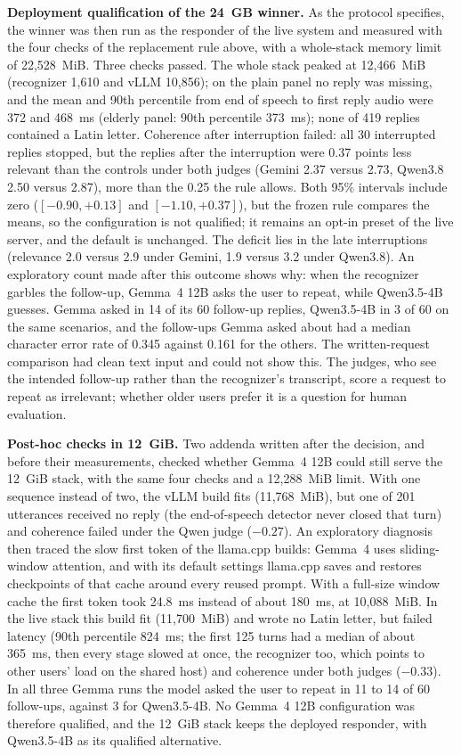 \textbf{Deployment qualification of the 24~GB winner.} As the protocol specifies, the winner
was then run as the responder of the live system and measured with the four checks of the
replacement rule above, with a whole-stack memory limit of 22,528~MiB. Three checks passed.
The whole stack peaked at 12,466~MiB (recognizer 1,610 and vLLM 10,856); on the plain panel
no reply was missing, and the mean and 90th percentile from end of speech to first reply
audio were 372 and 468~ms (elderly panel: 90th percentile 373~ms); none of 419 replies
contained a Latin letter. Coherence after interruption failed: all 30 interrupted replies
stopped, but the replies after the interruption were 0.37 points less relevant than the
controls under both judges (Gemini 2.37 versus 2.73, Qwen3.8 2.50 versus 2.87), more than the
0.25 the rule allows. Both 95\% intervals include zero ($[-0.90, +0.13]$ and $[-1.10, +0.37]$),
but the frozen rule compares the means, so the configuration is not qualified; it remains an
opt-in preset of the live server, and the default is unchanged. The deficit lies in the late
interruptions (relevance 2.0 versus 2.9 under Gemini, 1.9 versus 3.2 under Qwen3.8). An
exploratory count made after this outcome shows why: when the recognizer garbles the
follow-up, Gemma~4 12B asks the user to repeat, while Qwen3.5-4B guesses. Gemma asked in 14
of its 60 follow-up replies, Qwen3.5-4B in 3 of 60 on the same scenarios, and the follow-ups
Gemma asked about had a median character error rate of 0.345 against 0.161 for the others.
The written-request comparison had clean text input and could not show this. The judges,
who see the intended follow-up rather than the recognizer's transcript, score a request to
repeat as irrelevant; whether older users prefer it is a question for human evaluation.

\textbf{Post-hoc checks in 12~GiB.} Two addenda written after the decision, and before their
measurements, checked whether Gemma~4 12B could still serve the 12~GiB stack, with the same four
checks and a 12,288~MiB limit. With one sequence instead of two, the vLLM build fits (11,768~MiB),
but one of 201 utterances received no reply (the end-of-speech detector never closed that turn) and
coherence failed under the Qwen judge ($-0.27$). An exploratory diagnosis then traced the slow first
token of the llama.cpp builds: Gemma~4 uses sliding-window attention, and with its default settings
llama.cpp saves and restores checkpoints of that cache around every reused prompt. With a full-size
window cache the first token took 24.8~ms instead of about 180~ms, at 10,088~MiB. In the live
stack this build fit (11,700~MiB) and wrote no Latin letter, but failed latency (90th percentile
824~ms; the first 125 turns had a median of about 365~ms, then every stage slowed at once, the
recognizer too, which points to other users' load on the shared host) and coherence under both
judges ($-0.33$). In all three Gemma runs the model asked the user to repeat in 11 to 14 of 60
follow-ups, against 3 for Qwen3.5-4B. No Gemma~4 12B configuration was therefore qualified, and the
12~GiB stack keeps the deployed responder, with Qwen3.5-4B as its qualified alternative.


